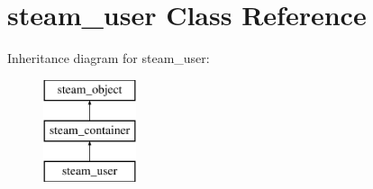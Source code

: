 \hypertarget{classsteam__user}{
\section{steam\_\-user Class Reference}
\label{classsteam__user}
}
Inheritance diagram for steam\_\-user:\begin{figure}[H]
\begin{center}
\leavevmode
\includegraphics[height=3.000000cm]{classsteam__user}
\end{center}
\end{figure}
